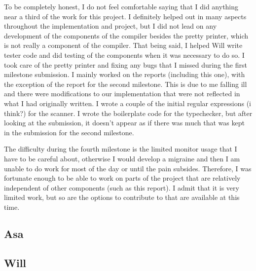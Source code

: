 \documentclass{article}
\begin{document}
To be completely honest, I do not feel comfortable saying that I did anything near a third of the work for this project. I definitely helped out in many aspects throughout the implementation and project, but I did not lead on any development of the components of the compiler besides the pretty printer, which is not really a component of the compiler. That being said, I helped Will write tester code and did testing of the components when it was necessary to do so. I took care of the pretty printer and fixing any bugs that I missed during the first milestone submission. I mainly worked on the reports (including this one), with the exception of the report for the second milestone. This is due to me falling ill and there were modifications to our implementation that were not reflected in what I had originally written. I wrote a couple of the initial regular expressions (i think?) for the scanner. I wrote the boilerplate code for the typechecker, but after looking at the submission, it doesn't appear as if there was much that was kept in the submission for the second milestone.

The difficulty during the fourth milestone is the limited monitor usage that I have to be careful about, otherwise I would develop a migraine and then I am unable to do work for most of the day or until the pain subsides. Therefore, I was fortunate enough to be able to work on parts of the project that are relatively independent of other components (such as this report). I admit that it is very limited work, but so are the options to contribute to that are available at this time.

\subsection{Asa}


\subsection{Will}



\nocite{*}


\end{document}
